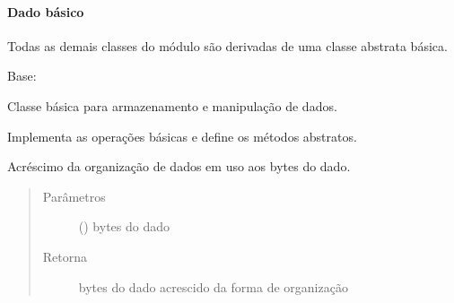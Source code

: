 \documentclass[letterpaper,10pt,brazil]{sphinxmanual}
\begin{document}
\paragraph{Dado básico}
\label{\detokenize{estrutarq.dado:dado-basico}}
\sphinxAtStartPar
Todas as demais classes do módulo são derivadas de uma classe abstrata básica.

\begin{fulllineitems}
\label{\detokenize{estrutarq.dado:estrutarq.dado.DadoBasico}}
\pysigstartsignatures
{}
\pysigstopsignatures
\sphinxAtStartPar
Base: 

\sphinxAtStartPar
Classe básica para armazenamento e manipulação de dados.

\sphinxAtStartPar
Implementa as operações básicas e define os métodos abstratos.

\begin{fulllineitems}
\label{\detokenize{estrutarq.dado:estrutarq.dado.DadoBasico.adicione_formatacao}}
\pysigstartsignatures
{}
\pysigstopsignatures
\sphinxAtStartPar
Acréscimo da organização de dados em uso aos bytes do dado.
\begin{quote}\begin{description}
\item[{Parâmetros}] \leavevmode
\sphinxAtStartPar
{} () \textendash{} bytes do dado

\item[{Retorna}] \leavevmode
\sphinxAtStartPar
bytes do dado acrescido da forma de organização


\end{description}
\end{quote}
\end{fulllineitems}
\end{fulllineitems}
\end{document}
